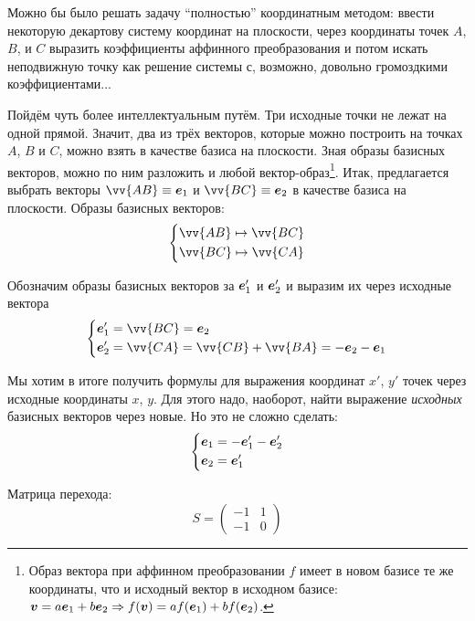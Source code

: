 \documentclass[a4paper,12pt]{article}
\begin{document}
  \begin{solution}
    Можно бы было решать задачу ``полностью'' координатным методом: ввести некоторую декартову систему координат на плоскости, через координаты точек $A$, $B$, и $C$ выразить коэффициенты аффинного преобразования и потом искать неподвижную точку как решение системы с, возможно, довольно громоздкими коэффициентами...
    
    Пойдём чуть более интеллектуальным путём.
    Три исходные точки не лежат на одной прямой.
    Значит, два из трёх векторов, которые можно построить на точках $A$, $B$ и $C$, можно взять в качестве базиса на плоскости.
    Зная образы базисных векторов, можно по ним разложить и любой вектор-образ\footnote{
      Образ вектора при аффинном преобразовании $f$ имеет в новом базисе те же координаты, что и исходный вектор в исходном базисе: $\bds v \hm= a \bds e_1 \hm+ b \bds e_2 \hm\Rightarrow f(\bds v) \hm= a f(\bds e_1) \hm+ b f(\bds e_2)$.
    }.
    Итак, предлагается выбрать векторы $\vv{AB} \hm\equiv \bds e_1$ и $\vv{BC} \hm\equiv \bds e_2$ в качестве базиса на плоскости.
    Образы базисных векторов:
    \[
      \left\{
        \begin{aligned}
          &\vv{AB} \mapsto \vv{BC}\\
          &\vv{BC} \mapsto \vv{CA}
        \end{aligned}
      \right.
    \]
    
    Обозначим образы базисных векторов за $\boldsymbol e_1'$ и $\boldsymbol e_2'$ и выразим их через исходные вектора
    \[
      \left\{
        \begin{aligned}
          &\bds e_1' = \vv{BC} = \bds e_2\\
          &\bds e_2' = \vv{CA} = \vv{CB} + \vv{BA} = -\bds e_2 - \bds e_1
        \end{aligned}
      \right.
    \]
    
    Мы хотим в итоге получить формулы для выражения координат $x'$, $y'$ точек через исходные координаты $x$, $y$.
    Для этого надо, наоборот, найти выражение \emph{исходных} базисных векторов через новые.
    Но это не сложно сделать:
    \[
      \left\{
        \begin{aligned}
          &\boldsymbol e_1 = -\boldsymbol e_1' - \boldsymbol e_2'\\
          &\boldsymbol e_2 = \boldsymbol e_1'
        \end{aligned}
      \right.
    \]
    
    Матрица перехода:
    \[
      S = \begin{pmatrix}-1 & 1\\ -1 & 0\end{pmatrix}
    \]
    

\end{solution}
\end{document}

